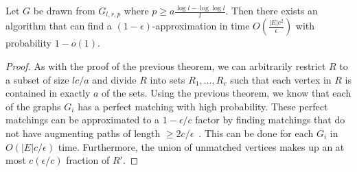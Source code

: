 \begin{thm}
Let $G$ be drawn from $G_{l,r,p}$ where $p \geq a\frac{\log l - \log\log l}{l}$. Then there
exists an algorithm that can find a $(1-\epsilon)$-approximation in time
$O(\frac{|E|c^2}{\epsilon})$ with probability $1-o(1)$.
\end{thm}
\begin{proof}
As with the proof of the previous theorem, we can arbitrarily restrict $R$ to a
subset of size $lc/a$ and divide $R$ into sets $R_1,\ldots,R_c$ such that each
vertex in $R$ is contained in exactly $a$ of the sets. Using the previous
theorem, we know that each of the graphs $G_i$ has a perfect matching with high
probability. These perfect matchings can be approximated to a $1-\epsilon/c$
factor by finding matchings that do not have augmenting paths of length
$\geq 2c/\epsilon$~\cite{LovaszPlummer1983}. This can be done for each
$G_i$ in $O(|E|c/\epsilon)$ time. Furthermore, the union of unmatched vertices
makes up an at most $c(\epsilon/c)$ fraction of $R'$.
\end{proof}

